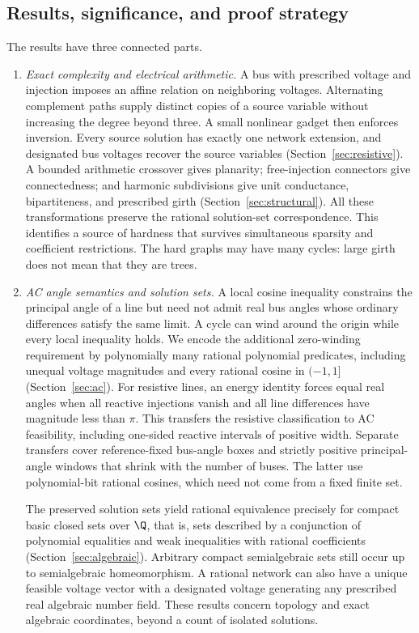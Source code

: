 \subsection{Results, significance, and proof strategy}

The results have three connected parts.

\begin{enumerate}
\item \emph{Exact complexity and electrical arithmetic.}
A bus with prescribed voltage and injection imposes an affine relation on
neighboring voltages.
Alternating complement paths supply distinct copies of a source variable
without increasing the degree beyond three. A small nonlinear gadget
then enforces inversion. Every source solution has exactly one network
extension, and designated bus voltages recover the source variables
(Section~\ref{sec:resistive}). A bounded arithmetic crossover gives
planarity; free-injection connectors give connectedness; and harmonic
subdivisions give unit conductance, bipartiteness, and prescribed girth
(Section~\ref{sec:structural}). All these transformations preserve the
rational solution-set correspondence. This identifies a source of hardness
that survives simultaneous sparsity and coefficient restrictions. The hard
graphs may have many cycles: large girth does not mean that they are trees.

\item \emph{AC angle semantics and solution sets.}
A local cosine inequality constrains the principal angle of a line but
need not admit real bus angles whose ordinary differences satisfy the same
limit. A cycle can wind around the origin while every local inequality
holds. We encode the additional zero-winding requirement by polynomially
many rational polynomial predicates, including unequal voltage magnitudes
and every rational cosine in $(-1,1]$ (Section~\ref{sec:ac}). For resistive
lines, an energy identity forces equal real angles when all reactive
injections vanish and all line differences have magnitude less than $\pi$.
This transfers the resistive classification to AC feasibility, including
one-sided reactive intervals of positive width. Separate transfers cover
reference-fixed bus-angle boxes and strictly positive principal-angle
windows that shrink with the number of buses. The latter use
polynomial-bit rational cosines, which need not come from a fixed finite set.

The preserved solution sets yield rational equivalence precisely for compact
basic closed sets over $\Q$, that is, sets described by a conjunction of
polynomial equalities and weak inequalities with rational coefficients
(Section~\ref{sec:algebraic}). Arbitrary compact semialgebraic sets still
occur up to semialgebraic homeomorphism. A rational network can also have a
unique feasible voltage vector with a designated voltage generating any
prescribed real algebraic number field. These results concern topology and
exact algebraic coordinates, beyond a count of isolated solutions.


\end{enumerate}
